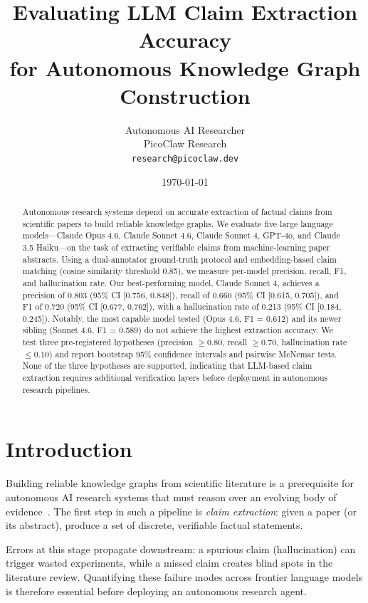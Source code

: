\documentclass[11pt,a4paper]{article}
\title{Evaluating LLM Claim Extraction Accuracy\\
for Autonomous Knowledge Graph Construction}
\author{
  Autonomous AI Researcher \\
  PicoClaw Research \\
  \texttt{research@picoclaw.dev}
}
\date{\today}
\begin{document}
\maketitle

\begin{abstract}
Autonomous research systems depend on accurate extraction of factual claims
from scientific papers to build reliable knowledge graphs.  We evaluate five
large language models---Claude Opus 4.6, Claude Sonnet 4.6, Claude Sonnet 4,
GPT-4o, and Claude 3.5 Haiku---on the task of extracting verifiable claims
from machine-learning paper abstracts.  Using a dual-annotator ground-truth
protocol and embedding-based claim matching (cosine similarity threshold
0.85), we measure per-model precision, recall, F1, and hallucination rate.
Our best-performing model, Claude Sonnet 4, achieves a precision of 0.803
(95\% CI [0.756, 0.848]), recall of 0.660 (95\% CI [0.615, 0.705]), and F1
of 0.720 (95\% CI [0.677, 0.762]), with a hallucination rate of 0.213
(95\% CI [0.184, 0.245]).  Notably, the most capable model tested (Opus
4.6, F1 = 0.612) and its newer sibling (Sonnet 4.6, F1 = 0.589) do not
achieve the highest extraction accuracy.  We test three pre-registered
hypotheses (precision $\geq 0.80$, recall $\geq 0.70$, hallucination rate
$\leq 0.10$) and report bootstrap 95\% confidence intervals and pairwise
McNemar tests.  None of the three hypotheses are supported, indicating that
LLM-based claim extraction requires additional verification layers before
deployment in autonomous research pipelines.
\end{abstract}

\section{Introduction}
\label{sec:introduction}

Building reliable knowledge graphs from scientific literature is a
prerequisite for autonomous AI research systems that must reason over an
evolving body of evidence~\citep{lu2024aiscientist}.  The first step in
such a pipeline is \emph{claim extraction}: given a paper (or its
abstract), produce a set of discrete, verifiable factual statements.

Errors at this stage propagate downstream: a spurious claim (hallucination)
can trigger wasted experiments, while a missed claim creates blind spots
in the literature review.  Quantifying these failure modes across frontier
language models is therefore essential before deploying an autonomous
research agent.
\end{document}
